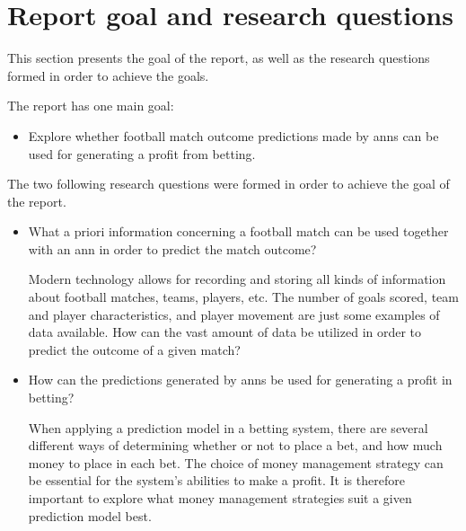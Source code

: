 \section{Report goal and research questions}
\label{sec:goal-research-questions}

This section presents the goal of the report, as well as the research questions formed in order to achieve the goals.

The report has one main goal:
\begin{itemize}
    \item Explore whether football match outcome predictions made by \glspl{ann} can be used for generating a profit from betting.
\end{itemize}

The two following research questions were formed in order to achieve the goal of the report.
\begin{itemize}
    \item What a priori information concerning a football match can be used together with an \gls{ann} in order to predict the match outcome?
    
    Modern technology allows for recording and storing all kinds of information about football matches, teams, players, etc. The number of goals scored, team and player characteristics, and player movement are just some examples of data available. How can the vast amount of data be utilized in order to predict the outcome of a given match?
    
    \item How can the predictions generated by \glspl{ann} be used for generating a profit in betting?
    
    When applying a prediction model in a betting system, there are several different ways of determining whether or not to place a bet, and how much money to place in each bet. The choice of money management strategy can be essential for the system's abilities to make a profit. It is therefore important to explore what money management strategies suit a given prediction model best.
\end{itemize}